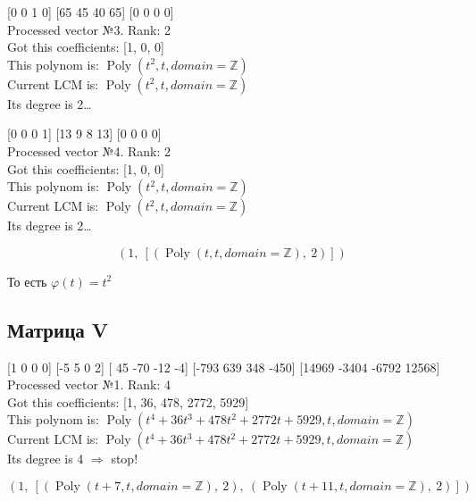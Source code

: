 \documentclass[12pt, a4paper]{article}
\begin{document}
    [0 0 1 0] [65 45 40 65] [0 0 0 0] \\
    Processed vector №3. Rank: 2\\
    Got this coefficients: [1, 0, 0]\\
    This polynom is: $\operatorname{Poly}{\left( t^{2}, t, domain=\mathbb{Z} \right)}$\\
    Current LCM is: $\operatorname{Poly}{\left( t^{2}, t, domain=\mathbb{Z} \right)}$\\
    Its degree is 2…

    [0 0 0 1] [13  9  8 13] [0 0 0 0] \\
    Processed vector №4. Rank: 2\\
    Got this coefficients: [1, 0, 0]\\
    This polynom is: $\operatorname{Poly}{\left( t^{2}, t, domain=\mathbb{Z} \right)}$\\
    Current LCM is: $\operatorname{Poly}{\left( t^{2}, t, domain=\mathbb{Z} \right)}$\\
    Its degree is 2…

    \begin{equation}\left( 1, \  \left[ \left( \operatorname{Poly}{\left( t, t, domain=\mathbb{Z} \right)}, \  2\right)\right]\right)\end{equation}

    То есть $\varphi(t) = t^2$

    \subsection{Матрица V}

    [1 0 0 0] [-5  5  0  2] [ 45 -70 -12  -4] [-793  639  348 -450] [14969 -3404 -6792 12568] \\
    Processed vector №1. Rank: 4\\
    Got this coefficients: [1, 36, 478, 2772, 5929]\\
    This polynom is: $\operatorname{Poly}{\left( t^{4} + 36 t^{3} + 478 t^{2} + 2772 t + 5929, t, domain=\mathbb{Z} \right)}$\\
    Current LCM is: $\operatorname{Poly}{\left( t^{4} + 36 t^{3} + 478 t^{2} + 2772 t + 5929, t, domain=\mathbb{Z} \right)}$\\
    Its degree is 4 $\Rightarrow$ stop!

    \begin{equation}\left( 1, \  \left[ \left( \operatorname{Poly}{\left( t + 7, t, domain=\mathbb{Z} \right)}, \  2\right), \  \left( \operatorname{Poly}{\left( t + 11, t, domain=\mathbb{Z} \right)}, \  2\right)\right]\right)\end{equation}
\end{document}
